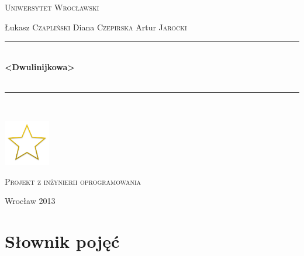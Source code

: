 \documentclass[11pt,wide]{mwart}
\newcommand{\HRule}{\rule{\linewidth}{0.5mm}}
\begin{document}
\begin{titlepage}
  \begin{center}

    \textsc{\LARGE Uniwersytet Wrocławski}\\[1.5cm]


    \vspace{3cm}

    \begin{minipage}{\textwidth}
      \begin{center} \Large
        Łukasz \textsc{Czapliński}
        Diana \textsc{Czepirska}
        Artur \textsc{Jarocki}
      \end{center}
    \end{minipage}

    \vspace{0.5cm}



    \HRule \\[0.4cm]
    { \huge \bfseries <Dwulinijkowa>\\<nazwa projektu>  \\[0.4cm] }

    \HRule \\[1.5cm]


    \vspace{1cm}

    \includegraphics[width=0.15\textwidth]{./non-starred.png}~\\[1cm]
    
    \vfill
    
    \textsc{\Large Projekt z inżynierii oprogramowania}\\[0.5cm]

    \vspace{1cm}

    {\large Wrocław 2013}

  \end{center}
\end{titlepage}
\section{\Large Słownik pojęć}
\begin{multicols}{2}
  
\end{multicols}
\end{document}
